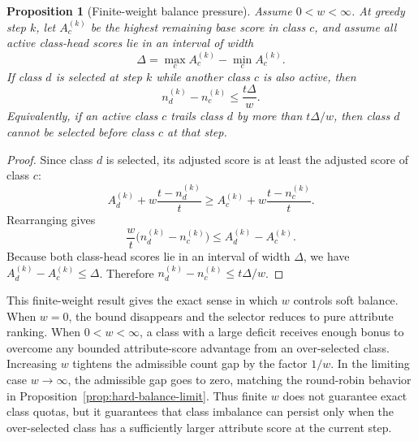 \documentclass{article}
\newtheorem{proposition}{Proposition}
\begin{document}
\begin{proposition}[Finite-weight balance pressure]
\label{prop:finite-weight-balance}
Assume $0<w<\infty$. At greedy step $k$, let $A_c^{(k)}$ be the highest remaining base score in class $c$, and assume all active class-head scores lie in an interval of width
\begin{equation}
\label{eq:class-head-width}
\Delta = \max_c A_c^{(k)} - \min_c A_c^{(k)}.
\end{equation}
If class $d$ is selected at step $k$ while another class $c$ is also active, then
\begin{equation}
\label{eq:finite-balance-gap}
n_d^{(k)} - n_c^{(k)} \leq \frac{t\Delta}{w}.
\end{equation}
Equivalently, if an active class $c$ trails class $d$ by more than $t\Delta/w$, then class $d$ cannot be selected before class $c$ at that step.
\end{proposition}

\begin{proof}
Since class $d$ is selected, its adjusted score is at least the adjusted score of class $c$:
\begin{equation}
\label{eq:finite-balance-proof-start}
A_d^{(k)} + w\frac{t-n_d^{(k)}}{t}
\geq
A_c^{(k)} + w\frac{t-n_c^{(k)}}{t}.
\end{equation}
Rearranging gives
\begin{equation}
\label{eq:finite-balance-proof-rearranged}
\frac{w}{t}\big(n_d^{(k)}-n_c^{(k)}\big)
\leq A_d^{(k)}-A_c^{(k)}.
\end{equation}
Because both class-head scores lie in an interval of width $\Delta$, we have $A_d^{(k)}-A_c^{(k)}\leq\Delta$. Therefore $n_d^{(k)}-n_c^{(k)}\leq t\Delta/w$.
\end{proof}

This finite-weight result gives the exact sense in which $w$ controls soft balance. When $w=0$, the bound disappears and the selector reduces to pure attribute ranking. When $0<w<\infty$, a class with a large deficit receives enough bonus to overcome any bounded attribute-score advantage from an over-selected class. Increasing $w$ tightens the admissible count gap by the factor $1/w$. In the limiting case $w\rightarrow\infty$, the admissible gap goes to zero, matching the round-robin behavior in Proposition~\ref{prop:hard-balance-limit}. Thus finite $w$ does not guarantee exact class quotas, but it guarantees that class imbalance can persist only when the over-selected class has a sufficiently larger attribute score at the current step.
\end{document}

